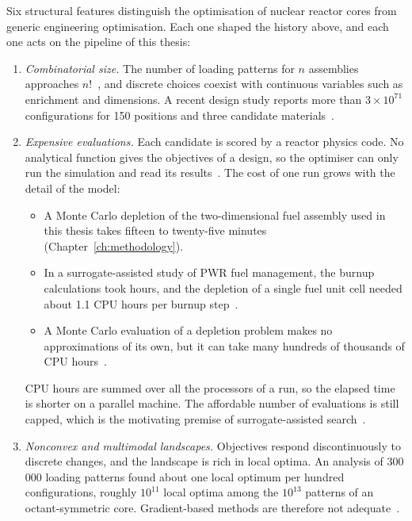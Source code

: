 Six structural features distinguish the optimisation of nuclear reactor
cores from generic engineering optimisation. Each one shaped the history above, and each
one acts on the pipeline of this thesis:

\begin{enumerate}
  \item \emph{Combinatorial size.} The number of loading patterns for
        $n$ assemblies approaches $n!$~\cite{stewart_2021}, and discrete
        choices coexist with continuous variables such as enrichment and
        dimensions. A recent design study reports more than
        $3\times10^{71}$ configurations for 150 positions and three
        candidate materials~\cite{pevey_2022}.

  \item \emph{Expensive evaluations.} Each candidate is scored by a
        reactor physics code. No analytical function gives the objectives
        of a design, so the optimiser can only run the simulation and read
        its results~\cite{jin_2011}. The cost of one run grows with the
        detail of the model:

        \begin{itemize}
          \item A Monte Carlo depletion of the two-dimensional fuel
                assembly used in this thesis takes fifteen to twenty-five
                minutes (Chapter~\ref{ch:methodology}).

          \item In a surrogate-assisted study of PWR fuel management, the
                burnup calculations took hours, and the depletion of a
                single fuel unit cell needed about 1.1 CPU hours per burnup
                step~\cite{whyte_2020}.

          \item A Monte Carlo evaluation of a depletion problem makes no
                approximations of its own, but it can take many hundreds
                of thousands of CPU hours~\cite{josey_2017}.
        \end{itemize}

        CPU hours are summed over all the processors of a run, so the
        elapsed time is shorter on a parallel machine. The affordable
        number of evaluations is still capped, which is the motivating
        premise of surrogate-assisted search~\cite{jin_2011}.

  \item \emph{Nonconvex and multimodal landscapes.} Objectives respond
        discontinuously to discrete changes, and the landscape is rich in
        local optima. An analysis of 300\,000 loading patterns found
        about one local optimum per hundred configurations, roughly
        $10^{11}$ local optima among the $10^{13}$ patterns of an
        octant-symmetric core. Gradient-based methods are therefore not
        adequate~\cite{meneses_2010}.


\end{enumerate}
